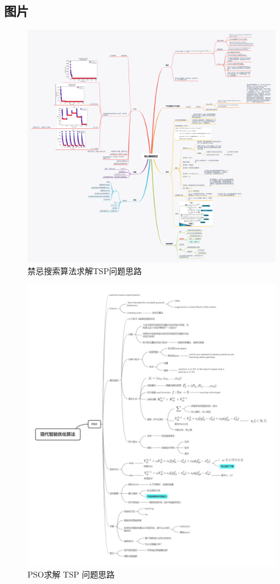 \documentclass[lang=cn,11pt]{elegantpaper}
\begin{document}
\newpage
\subsection{图片}
\begin{figure}[ht]
  \centering
  \includegraphics[width=1\textwidth]{figure/禁忌搜索算法.png} %
  \caption{禁忌搜索算法求解TSP问题思路} %
  \label{img:禁忌搜索算法} %
\end{figure}

\begin{figure}[ht]
  \centering
  \includegraphics[width=1\textwidth]{figure/PSO/现代智能优化算法——PSO笔记.png} %
  \caption{PSO求解 TSP 问题思路} %
  \label{img:PSO笔记} %
\end{figure}
\end{document}
